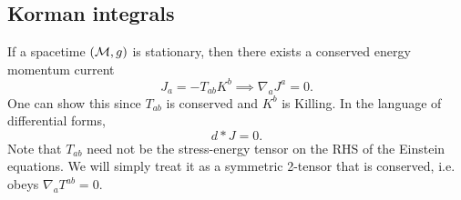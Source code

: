 \subsection*{Korman integrals}
If a spacetime $(\mathcal{M},g)$ is stationary, then there exists a conserved energy momentum current
\begin{equation}
    J_a = -T_{ab} K^b \implies \nabla_a J^a = 0.
\end{equation}
One can show this since $T_{ab}$ is conserved and $K^b$ is Killing. In the language of differential forms,
\begin{equation}
    d*J=0.
\end{equation}
Note that $T_{ab}$ need not be the stress-energy tensor on the RHS of the Einstein equations. We will simply treat it as a symmetric 2-tensor that is conserved, i.e. obeys $\nabla_a T^{ab}=0$.

